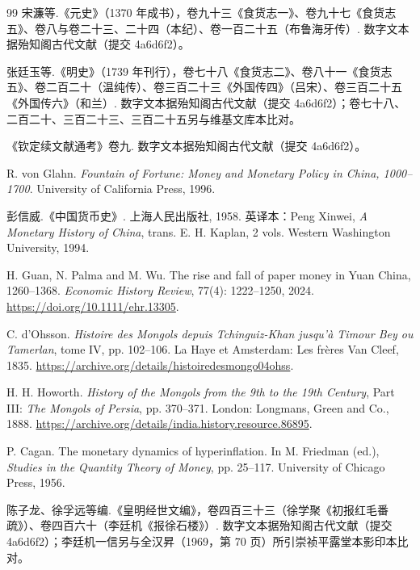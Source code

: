 \begin{thebibliography}{99}
 宋濂等.《元史》（1370 年成书），卷九十三《食货志一》、卷九十七《食货志五》、卷八与卷二十三、二十四（本纪）、卷一百二十五（布鲁海牙传）. 数字文本据殆知阁古代文献（提交 4a6d6f2）。

 张廷玉等.《明史》（1739 年刊行），卷七十八《食货志二》、卷八十一《食货志五》、卷二百二十（温纯传）、卷三百二十三《外国传四》（吕宋）、卷三百二十五《外国传六》（和兰）. 数字文本据殆知阁古代文献（提交 4a6d6f2）；卷七十八、二百二十、三百二十三、三百二十五另与维基文库本比对。

 《钦定续文献通考》卷九. 数字文本据殆知阁古代文献（提交 4a6d6f2）。

 R. von Glahn. \emph{Fountain of Fortune: Money and Monetary Policy in China, 1000--1700}. University of California Press, 1996.

 彭信威.《中国货币史》. 上海人民出版社, 1958. 英译本：Peng Xinwei, \emph{A Monetary History of China}, trans. E. H. Kaplan, 2 vols. Western Washington University, 1994.

 H. Guan, N. Palma and M. Wu. The rise and fall of paper money in Yuan China, 1260--1368. \emph{Economic History Review}, 77(4): 1222--1250, 2024. \url{https://doi.org/10.1111/ehr.13305}.

 C. d'Ohsson. \emph{Histoire des Mongols depuis Tchinguiz-Khan jusqu'à Timour Bey ou Tamerlan}, tome IV, pp. 102--106. La Haye et Amsterdam: Les frères Van Cleef, 1835. \url{https://archive.org/details/histoiredesmongo04ohss}.

 H. H. Howorth. \emph{History of the Mongols from the 9th to the 19th Century}, Part III: \emph{The Mongols of Persia}, pp. 370--371. London: Longmans, Green and Co., 1888. \url{https://archive.org/details/india.history.resource.86895}.

 P. Cagan. The monetary dynamics of hyperinflation. In M. Friedman (ed.), \emph{Studies in the Quantity Theory of Money}, pp. 25--117. University of Chicago Press, 1956.

 陈子龙、徐孚远等编.《皇明经世文编》，卷四百三十三（徐学聚《初报红毛番疏》）、卷四百六十（李廷机《报徐石楼》）. 数字文本据殆知阁古代文献（提交 4a6d6f2）；李廷机一信另与全汉昇（1969，第 70 页）所引崇祯平露堂本影印本比对。


\end{thebibliography}
